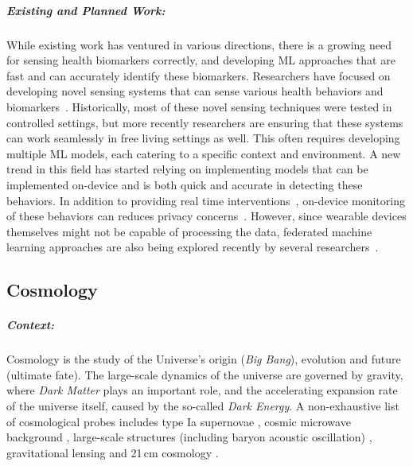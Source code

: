 \subparagraph*{Existing and Planned Work:} While existing work has ventured in various directions, there is a growing need for sensing health biomarkers correctly, and developing ML approaches that are fast and can accurately identify these biomarkers. 
Researchers have focused on developing novel sensing systems that can sense various  health behaviors and biomarkers~\cite{holz2017glabella,pham2020wake,chun2020intraoral,bui2019ebp,li2020noninvasive,echterhoff2020personal,bedri2020fitbyte}. Historically, most of these novel sensing techniques were tested in controlled settings, but more recently researchers are ensuring that these systems can work seamlessly in free living settings as well. 
This often requires developing multiple ML models, each catering to a specific context and environment. 
A new trend in this field has started relying on implementing models that can be implemented on-device and is both quick and accurate in detecting these behaviors. In addition to providing real time interventions~\cite{nahum2018just,thomas2015behavioral}, on-device monitoring of these behaviors can reduces privacy concerns~\cite{sadek2019privacy}. 
However, since wearable devices themselves might not be capable of processing the data, federated machine learning approaches are also being explored recently by several researchers~\cite{rieke2020future}.  


\subsection{Cosmology}

\subparagraph*{Context:} Cosmology is the study of the Universe's origin (\textit{Big Bang}), evolution and future (ultimate fate). The large-scale dynamics of the universe are governed by gravity, where \textit{Dark Matter} plays an important role, and the accelerating expansion rate of the universe itself, caused by the so-called \textit{Dark Energy}. 
A non-exhaustive list of cosmological probes includes type Ia supernovae \citep[][]{Riess_1998, Perlmutter_1999, Betoule_2014, Scolnic_2018, Abbott_2019}, cosmic microwave background \citep[][]{Fixsen_1996, Spergel_2003, Komatsu_2011, PC_2016, PC_2020}, large-scale structures (including baryon acoustic oscillation) \citep[][]{Eisenstein_2005, Percival_2010, Delubac_2015, Abbott_2019b}, gravitational lensing \citep[][]{Bacon_2000, Bacon_2003, Collett_2014, Suyu_2017, Heymans_2020} and 21\,cm cosmology \citep[][]{McQuinn_2007, Pritchard_2012, Maartens_2015, Beardsley_2016}.
    
